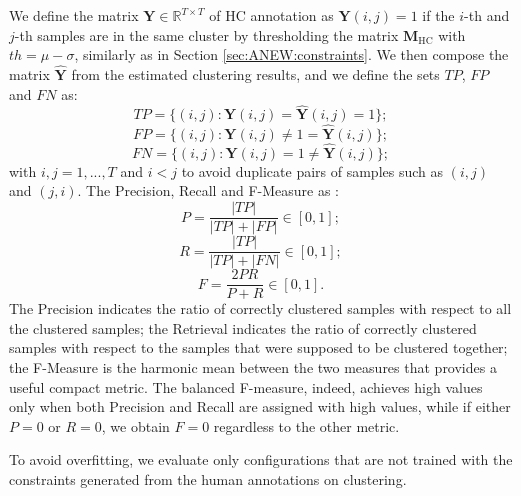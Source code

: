 We define the matrix $\mathbf{Y}\in \mathbb{R}^{T \times T}$ of HC annotation as $\mathbf{Y}(i,j)=1$ if the $i$-th and $j$-th samples are in the same cluster by thresholding the matrix $\mathbf{M}_{\text{HC}}$ with $th=\mu-\sigma$, similarly as in Section \ref{sec:ANEW:constraints}. We then compose the matrix $\hat{\mathbf{Y}}$ from the estimated clustering results, and we define the sets $TP$, $FP$ and $FN$ as:
\begin{equation}
TP=\{(i,j) : \mathbf{Y}(i,j)=\hat{\mathbf{Y}}(i,j)=1 \};
\end{equation}
\begin{equation}
FP=\{(i,j) : \mathbf{Y}(i,j)\neq 1=\hat{\mathbf{Y}}(i,j) \};
\end{equation}
\begin{equation}
FN=\{(i,j) : \mathbf{Y}(i,j)=1 \neq \hat{\mathbf{Y}}(i,j) \}; 
\end{equation}
with $i,j=1,...,T$ and  $i<j$ to avoid duplicate pairs of samples such as $(i,j)$ and $(j,i)$. The Precision, Recall and F-Measure as \cite{Manning2008}: 
\begin{equation}\label{eq:HLFs:P}
P=\frac{|TP|}{|TP|+|FP|}\in [0,1];
\end{equation}
\begin{equation}\label{eq:HLFs:R}
R=\frac{|TP|}{|TP|+|FN|}\in [0,1];
\end{equation}
\begin{equation}\label{eq:HLFs:F}
F=\frac{2 P R}{P+R}\in [0,1].
\end{equation}
The Precision indicates the ratio of correctly clustered samples with respect to all the clustered samples; the Retrieval indicates the ratio of correctly clustered samples with respect to the samples that were supposed to be clustered together; the F-Measure is the harmonic mean between the two measures that provides a useful compact metric. The balanced F-measure, indeed, achieves high values only when both Precision and Recall are assigned with high values, while if either $P=0$ or $R=0$, we obtain $F=0$ regardless to the other metric.  

To avoid overfitting, we evaluate only configurations that are not trained with the constraints generated from the human annotations on clustering.

